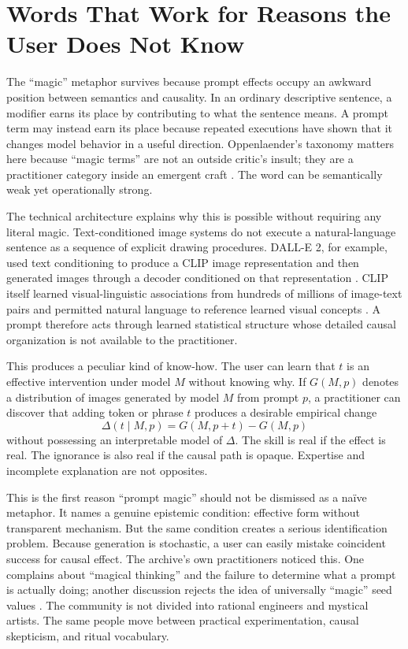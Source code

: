 \documentclass[11pt]{article}
\begin{document}
\section{Words That Work for Reasons the User Does Not Know}

The ``magic'' metaphor survives because prompt effects occupy an awkward position between semantics and causality. In an ordinary descriptive sentence, a modifier earns its place by contributing to what the sentence means. A prompt term may instead earn its place because repeated executions have shown that it changes model behavior in a useful direction. Oppenlaender's taxonomy matters here because ``magic terms'' are not an outside critic's insult; they are a practitioner category inside an emergent craft \parencite{oppenlaender2022taxonomy}. The word can be semantically weak yet operationally strong.

The technical architecture explains why this is possible without requiring any literal magic. Text-conditioned image systems do not execute a natural-language sentence as a sequence of explicit drawing procedures. DALL-E 2, for example, used text conditioning to produce a CLIP image representation and then generated images through a decoder conditioned on that representation \parencite{ramesh2022hierarchical}. CLIP itself learned visual-linguistic associations from hundreds of millions of image-text pairs and permitted natural language to reference learned visual concepts \parencite{radford2021learning}. A prompt therefore acts through learned statistical structure whose detailed causal organization is not available to the practitioner.

This produces a peculiar kind of know-how. The user can learn that $t$ is an effective intervention under model $M$ without knowing why. If $G(M,p)$ denotes a distribution of images generated by model $M$ from prompt $p$, a practitioner can discover that adding token or phrase $t$ produces a desirable empirical change
\[
\Delta(t\mid M,p)=G(M,p+t)-G(M,p)
\]
without possessing an interpretable model of $\Delta$. The skill is real if the effect is real. The ignorance is also real if the causal path is opaque. Expertise and incomplete explanation are not opposites.

This is the first reason ``prompt magic'' should not be dismissed as a naïve metaphor. It names a genuine epistemic condition: effective form without transparent mechanism. But the same condition creates a serious identification problem. Because generation is stochastic, a user can easily mistake coincident success for causal effect. The archive's own practitioners noticed this. One complains about ``magical thinking'' and the failure to determine what a prompt is actually doing; another discussion rejects the idea of universally ``magic'' seed values \parencite{hartsoe2022midjourneyarchive}. The community is not divided into rational engineers and mystical artists. The same people move between practical experimentation, causal skepticism, and ritual vocabulary.
\end{document}
